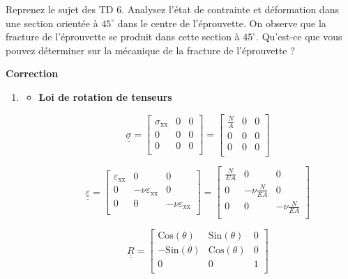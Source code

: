 \documentclass
[
a4paper,                      %
twoside,					  %
12pt,                         %
abstract,		      %
fleqn,                        %
]
{scrartcl} %
\begin{document}
Reprenez le sujet des TD 6. Analysez l'\'etat de contrainte et d\'eformation dans une section orient\'ee \`a $45^{\circ}$ dans le centre de l'\'eprouvette. On observe que la fracture de l'\'eprouvette se produit dans cette section \`a $45^{\circ}$. Qu'est-ce que vous pouvez d\'eterminer sur la m\'ecanique de la fracture de l'\'eprouvette ?

\newpage
\textbf{Correction}

\begin{enumerate}
\item 

\begin{itemize}
\item \textbf{Loi de rotation de tenseurs }

\begin{equation}
\underline{\underline{\sigma}}=\begin{bmatrix}
 \sigma _{\text{xx}} & 0 & 0 \\
 0 & 0 & 0 \\
 0 & 0 & 0 \\
\end{bmatrix}=\begin{bmatrix}
 \frac{N}{A} & 0 & 0 \\
 0 & 0 & 0 \\
 0 & 0 & 0 \\
\end{bmatrix}
\end{equation}

\begin{equation}
\underline{\underline{\varepsilon}}=\begin{bmatrix}
 \varepsilon _{\text{xx}} & 0 & 0 \\
 0 & -\nu  \varepsilon _{\text{xx}} & 0 \\
 0 & 0 & -\nu  \varepsilon _{\text{xx}} \\
\end{bmatrix}=\begin{bmatrix}
\frac{N}{EA} & 0 & 0 \\
 0 & -\nu  \frac{N}{EA} & 0 \\
 0 & 0 & -\nu  \frac{N}{EA} \\
\end{bmatrix}
\end{equation}

\begin{equation}
\underline{\underline{R}}=\begin{bmatrix}
  \text{Cos}\left(\theta\right) & \text{Sin}\left(\theta\right) & 0 \\
 -\text{Sin}\left(\theta\right) & \text{Cos}\left(\theta\right) & 0 \\
 0 & 0 & 1 \\
\end{bmatrix}
\end{equation}


\end{itemize}
\end{enumerate}
\end{document}

